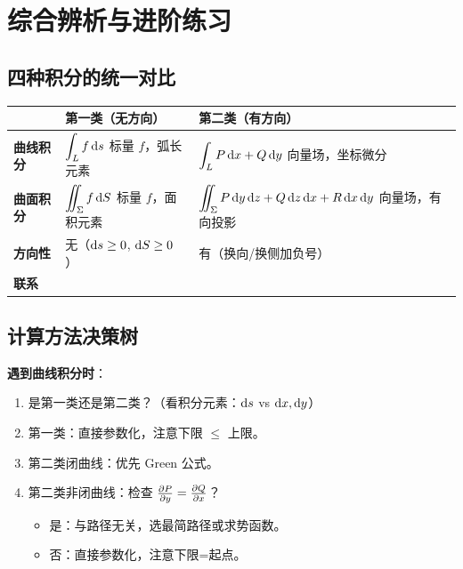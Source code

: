 \documentclass{article}
\begin{document}
\section{综合辨析与进阶练习}

\subsection{四种积分的统一对比}

\begin{center}
  \renewcommand{\arraystretch}{1.5}
  \begin{tabular}{>{\raggedright\arraybackslash}p{2.2cm}
      >{\raggedright\arraybackslash}p{5cm}
    >{\raggedright\arraybackslash}p{5cm}}
    \toprule
    & \textbf{第一类（无方向）} & \textbf{第二类（有方向）} \\
    \midrule
    \textbf{曲线积分}
    & $\displaystyle\int_L f \,\mathrm{d} s$
    \newline 标量 $f$，弧长元素
    & $\displaystyle\int_L P\,\mathrm{d} x + Q\,\mathrm{d} y$
    \newline 向量场，坐标微分 \\
    \textbf{曲面积分}
    & $\displaystyle\iint_\Sigma f \,\mathrm{d} S$
    \newline 标量 $f$，面积元素
    & $\displaystyle\iint_\Sigma P\,\mathrm{d} y\,\mathrm{d} z + Q\,\mathrm{d} z\,\mathrm{d}
    x + R\,\mathrm{d} x\,\mathrm{d} y$
    \newline 向量场，有向投影 \\
    \midrule
    \textbf{方向性}
    & 无（$\mathrm{d} s \ge 0$, $\mathrm{d} S \ge 0$）
    & 有（换向/换侧加负号） \\
    \textbf{联系}
    & \multicolumn{2}{c}{$\text{第二类} = \int (\text{向量} \cdot
    \text{方向向量}) \,\dif\text{几何度量}$} \\
    \bottomrule
  \end{tabular}
\end{center}

\subsection{计算方法决策树}

\textbf{遇到曲线积分时}：
\begin{enumerate}
  \item 是第一类还是第二类？（看积分元素：$\mathrm{d} s$ vs $\mathrm{d} x, \mathrm{d} y$）
  \item 第一类：直接参数化，注意下限 $\le$ 上限。
  \item 第二类闭曲线：优先 Green 公式。
  \item 第二类非闭曲线：检查 $\frac{\partial P}{\partial y}=\frac{\partial Q}{\partial x}$？
    \begin{itemize}
      \item 是：与路径无关，选最简路径或求势函数。
      \item 否：直接参数化，注意下限=起点。
    \end{itemize}
\end{enumerate}
\end{document}

